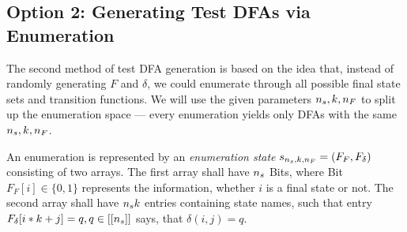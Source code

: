 \subsection{Option 2: Generating Test DFAs via Enumeration}


The second method of test DFA generation is based on the idea that, instead of randomly generating $F$ and $\delta$, we could enumerate through all possible final state sets and transition functions. We will use the given parameters ${n_s}, k, {n_F}$ to split up the enumeration space --- every enumeration yields only DFAs with the same ${n_s}, k, {n_F}$.


An enumeration is represented by an \emph{enumeration state} $s_{{n_s}, k, {n_F}} = (F_F,F_\delta)$ consisting of two arrays\footnotemark. The first array shall have ${n_s}$ Bits, where Bit $F_F[i] \in \{0,1\}$ represents the information, whether $i$ is a final state or not. The second array shall have ${n_s}k$ entries containing state names, such that entry $F_\delta[i * k + j] = q, q\in [[{n_s}]]$ says, that $\delta(i, j) = q$.



